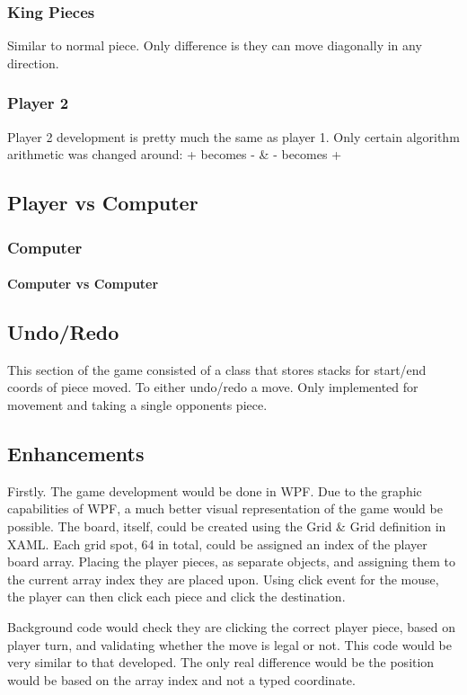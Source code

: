 \documentclass[10pt, a4paper]{article}
\begin{document}
    \subsubsection{King Pieces}
    Similar to normal piece. Only difference is they can move diagonally in any direction.
    \subsubsection{Player 2}
    Player 2 development is pretty much the same as player 1. Only certain algorithm arithmetic was changed around: + becomes - \& - becomes +
    \subsection{Player vs Computer}    
    \subsubsection{Computer}
    \paragraph{Computer vs Computer}
    \subsection{Undo/Redo}
    This section of the game consisted of a class that stores stacks for start/end coords of piece moved. To either undo/redo a move. Only implemented for movement and taking a single opponents piece. 
    \subsection{Enhancements}
    Firstly. The game development would be done in WPF. Due to the graphic capabilities of WPF, a much better visual representation of the game would be possible. The board, itself, could be created using the Grid \& Grid definition in XAML. Each grid spot, 64 in total, could be assigned an index of the player board array. Placing the player pieces, as separate objects, and assigning them to the current array index they are placed upon. Using click event for the mouse, the player can then click each piece and click the destination. 
    
    Background code would check they are clicking the correct player piece, based on player turn, and validating whether the move is legal or not. This code would be very similar to that developed. The only real difference would be the position would be based on the array index and not a typed coordinate. 
    
\end{document}
